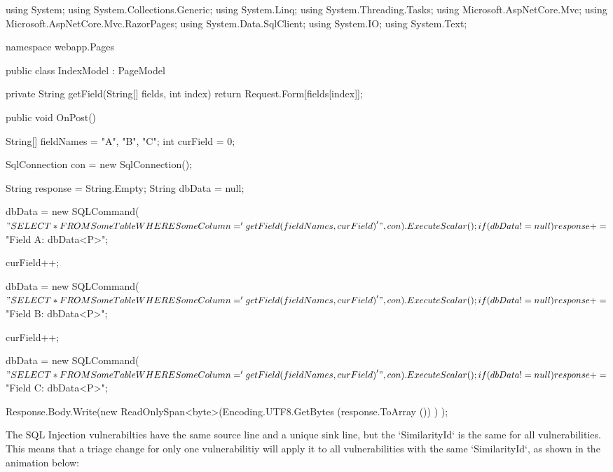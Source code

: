 \begin{code}{}{}{}
using System;
using System.Collections.Generic;
using System.Linq;
using System.Threading.Tasks;
using Microsoft.AspNetCore.Mvc;
using Microsoft.AspNetCore.Mvc.RazorPages;
using System.Data.SqlClient;
using System.IO;
using System.Text;

namespace webapp.Pages
{
    public class IndexModel : PageModel
    {

        private String getField(String[] fields, int index)
        {
            return Request.Form[fields[index]];
        }


        public void OnPost()
        {

            String[] fieldNames = {"A", "B", "C"};
            int curField = 0;
                        
            SqlConnection con = new SqlConnection();

            String response = String.Empty;
            String dbData = null;
            
            dbData = new SQLCommand($"SELECT * FROM SomeTable WHERE SomeColumn = '{getField(fieldNames, curField)}'", con).ExecuteScalar();
            if (dbData != null)
              response += $"Field A: {dbData}<P>";
            
            curField++;

            dbData = new SQLCommand($"SELECT * FROM SomeTable WHERE SomeColumn = '{getField(fieldNames, curField)}'", con).ExecuteScalar();
            if (dbData != null)
              response += $"Field B: {dbData}<P>";

            curField++;

            dbData = new SQLCommand($"SELECT * FROM SomeTable WHERE SomeColumn = '{getField(fieldNames, curField)}'", con).ExecuteScalar();
            if (dbData != null)
              response += $"Field C: {dbData}<P>";
            
            Response.Body.Write(new ReadOnlySpan<byte>(Encoding.UTF8.GetBytes (response.ToArray ()) ) );
        }
    }
}

\end{code}

The SQL Injection vulnerabilties have the same source line and a unique sink line, but the `SimilarityId` is the same for all vulnerabilities.  This means that a triage change for only one vulnerabilitiy will apply it to all vulnerabilities with the same `SimilarityId`, as shown in the animation below:


